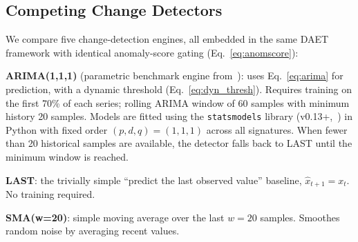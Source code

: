 \documentclass[a4paper,fleqn]{cas-sc}
\theoremstyle{plain}
\begin{document}
\begin{table}[tbp]
\centering
{}
\caption{Mozilla Treeherder dataset configurations.
  \emph{Canonical pipeline} (Section~\ref{sec:three_way}): 60\%/20\%/20\%
  chronological split, 30-point length filter, independent held-out
  validation for HP tuning.
  \emph{Calibration baseline} (Section~\ref{sec:largescale:RQ1}):
  70\%/30\% split on Firefox-Android only, 50-point filter, no independent
  validation hold-out --- retained for prior-work comparison.}
\label{tab:dataset}
\end{table}

\subsection{Competing Change Detectors}\label{sec:largescale:detectors}

We compare five change-detection engines, all embedded in the same DAET
framework with identical anomaly-score gating (Eq.~\ref{eq:anomscore}):

\textbf{ARIMA(1,1,1)} (parametric benchmark engine from~\cite{10197790}): uses Eq.~\ref{eq:arima} for
prediction, with a dynamic threshold (Eq.~\ref{eq:dyn_thresh}).
Requires training on the first 70\% of each series; rolling ARIMA window
of 60 samples with minimum history 20 samples.
Models are fitted using the \texttt{statsmodels} library
(v0.13+,~\cite{seabold2010statsmodels}) in Python with fixed order
$(p,d,q)=(1,1,1)$ across all signatures.
When fewer than 20 historical samples are available, the detector falls
back to LAST until the minimum window is reached.

\textbf{LAST}: the trivially simple ``predict the last observed value''
baseline, $\hat{x}_{t+1} = x_t$.
No training required.

\textbf{SMA(w=20)}: simple moving average over the last $w=20$ samples.
Smoothes random noise by averaging recent values.
\end{document}
